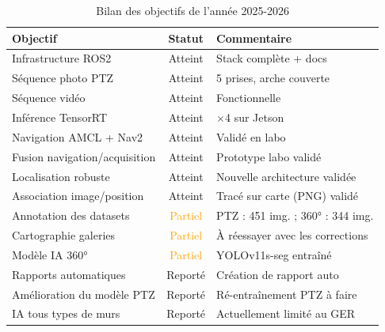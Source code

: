 \documentclass[12pt,a4paper]{article}
\begin{document}
\begin{table}[htbp]
    \centering
    \begin{tabular}{|p{5.5cm}|c|p{6.5cm}|}
        \hline
        \textbf{Objectif} & \textbf{Statut} & \textbf{Commentaire} \\
        \hline
        Infrastructure ROS2 & \textcolor{green!60!black}{Atteint} & Stack complète + docs \\
        \hline
        Séquence photo PTZ & \textcolor{green!60!black}{Atteint} & 5 prises, arche couverte \\
        \hline
        Séquence vidéo & \textcolor{green!60!black}{Atteint} & Fonctionnelle \\
        \hline
        Inférence TensorRT & \textcolor{green!60!black}{Atteint} & $\times$4 sur Jetson \\
        \hline
        Navigation AMCL + Nav2 & \textcolor{green!60!black}{Atteint} & Validé en labo \\
        \hline
        Fusion navigation/acquisition & \textcolor{green!60!black}{Atteint} & Prototype labo validé \\
        \hline
        Localisation robuste & \textcolor{green!60!black}{Atteint} & Nouvelle architecture validée \\
        \hline
        Association image/position & \textcolor{green!60!black}{Atteint} & Tracé sur carte (PNG) validé \\
        \hline
        Annotation des datasets & \textcolor{orange}{Partiel} & PTZ : 451 img. ; 360° : 344 img. \\
        \hline
        Cartographie galeries & \textcolor{orange}{Partiel} & À réessayer avec les corrections \\
        \hline
        Modèle IA 360° & \textcolor{orange}{Partiel} & YOLOv11s-seg entraîné \\
        \hline
        Rapports automatiques & \textcolor{red!70!black}{Reporté} & Création de rapport auto \\
        \hline
        Amélioration du modèle PTZ & \textcolor{red!70!black}{Reporté} & Ré-entraînement PTZ à faire \\
        \hline
        IA tous types de murs & \textcolor{red!70!black}{Reporté} & Actuellement limité au GER \\
        \hline
    \end{tabular}
    \caption{Bilan des objectifs de l'année 2025-2026}
    \label{tab:bilan}
\end{table}
\end{document}
